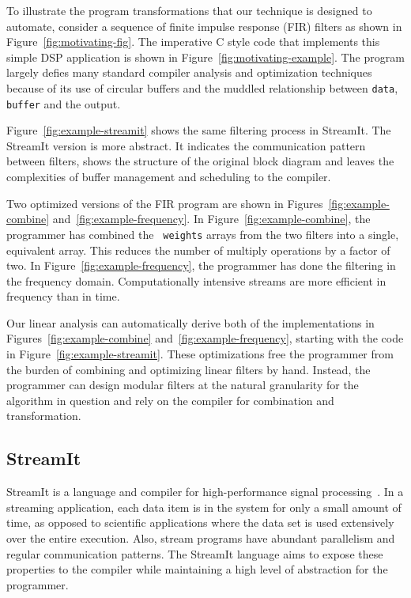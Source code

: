 \documentclass{sig-alternate}
\begin{document}
To illustrate the program transformations that our technique is
designed to automate, consider a sequence of finite impulse response
(FIR) filters as shown in Figure~\ref{fig:motivating-fig}. The
imperative C style code that implements this simple DSP application is
shown in Figure~\ref{fig:motivating-example}. 
The program largely defies many standard compiler analysis
and optimization techniques because of its use of circular buffers and
the muddled relationship between {\tt data}, {\tt buffer} and the
output.

Figure~\ref{fig:example-streamit} shows the same filtering process
in StreamIt. The StreamIt version is more abstract.  
It indicates the communication pattern between
filters, shows the structure of the original block diagram and leaves
the complexities of buffer management and scheduling to the compiler.

Two optimized versions of the FIR program are shown in
Figures~\ref{fig:example-combine} and~\ref{fig:example-frequency}.  In
Figure~\ref{fig:example-combine}, the programmer has combined the {\tt
weights} arrays from the two filters into a single, equivalent array.
This reduces the number of multiply operations by a factor of two.  In
Figure~\ref{fig:example-frequency}, the programmer has done the
filtering in the frequency domain.
Computationally intensive streams are more efficient
in frequency than in time.

Our linear analysis can automatically derive both of the
implementations in Figures~\ref{fig:example-combine}
and~\ref{fig:example-frequency}, starting with the code in
Figure~\ref{fig:example-streamit}.  These optimizations free the
programmer from the burden of combining and optimizing linear filters
by hand.  Instead, the programmer can design modular filters at the
natural granularity for the algorithm in question and rely on the
compiler for combination and transformation.

\subsection{StreamIt}

StreamIt is a language and compiler for high-performance signal
processing~\cite{gordon-thesis,streamit-asplos,streamitcc}.  In a
streaming application, each data item is in the system for only a
small amount of time, as opposed to scientific applications where the
data set is used extensively over the entire execution.  Also, stream
programs have abundant parallelism and regular communication patterns.
The StreamIt language aims to expose these properties to the compiler
while maintaining a high level of abstraction for the programmer.
\end{document}
